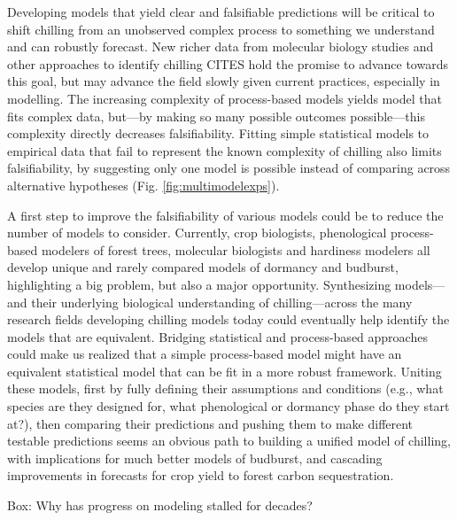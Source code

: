\documentclass[11pt]{article}
\begin{document}
Developing models that yield clear and falsifiable predictions will be critical to shift chilling from an unobserved complex process to something we understand and can robustly forecast. New richer data from molecular biology studies and other approaches to identify chilling CITES hold the promise to advance towards this goal, but may advance the field slowly given current practices, especially in modelling. The increasing complexity of process-based models yields model that fits complex data, but---by making so many possible outcomes possible---this complexity directly decreases falsifiability. Fitting simple statistical models to empirical data that fail to represent the known complexity of chilling also limits falsifiability, by suggesting only one model is possible instead of comparing across alternative hypotheses (Fig. \ref{fig:multimodelexps}). 

A first step to improve the falsifiability of various models could be to reduce the number of models to consider. Currently, crop biologists, phenological process-based modelers of forest trees, molecular biologists and hardiness modelers all develop unique and rarely compared models of dormancy and budburst, highlighting a big problem, but also a major opportunity. Synthesizing models---and their underlying biological understanding of chilling---across the many research fields developing chilling models today could eventually help identify the models that are equivalent. Bridging statistical and process-based approaches could make us realized that a simple process-based model might have an equivalent statistical model that can be fit in a more robust framework.  Uniting these models, first by fully defining their assumptions and conditions (e.g., what species are they designed for, what phenological or dormancy phase do they start at?), then comparing their predictions and pushing them to make different testable predictions seems an obvious path to building a unified model of chilling, with implications for much better models of budburst, and cascading improvements in forecasts for crop yield to forest carbon sequestration. 


\vspace{10ex}
{\sc Box: Why has progress on modeling stalled for decades?} %
\end{document}
